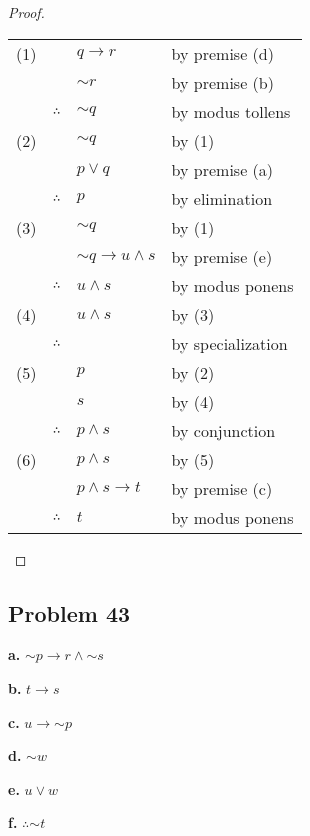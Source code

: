 \documentclass[14pt]{extarticle}
\begin{document}
\begin{proof}
\begin{tabular}{rrll}
(1) & & $q \to r$ & by premise (d) \\
 & & ${\sim r}$ & by premise (b) \\
 & $\therefore$ & ${\sim q}$ & by modus tollens \\
(2) & & ${\sim q}$ & by (1) \\
 & & $p \vee q$ & by premise (a) \\
 & $\therefore$ & $p$ & by elimination \\
(3) & & ${\sim q}$ & by (1) \\
 & & ${\sim q} \to u \wedge s$ & by premise (e) \\
 & $\therefore$ & $u \wedge s$ & by modus ponens \\
(4) & & $u \wedge s$ & by (3) \\
 & $\therefore$ & $ $ & by specialization \\
(5) & & $p$ & by (2) \\
 & & $s$ & by (4) \\
 & $\therefore$ & $p \wedge s$ & by conjunction \\
(6) & & $p \wedge s$ & by (5) \\
 & & $p \wedge s \to t$ & by premise (c) \\
 & $\therefore$ & $t$ & by modus ponens \\
\end{tabular}
\end{proof}

\subsection{Problem 43}
{\bf a.} ${\sim p} \to r \wedge {\sim s}$

{\bf b.} $t \to s$

{\bf c.} $u \to {\sim p}$

{\bf d.} ${\sim w}$

{\bf e.} $u \vee w$

{\bf f.} $\therefore {\sim t}$
\end{document}
